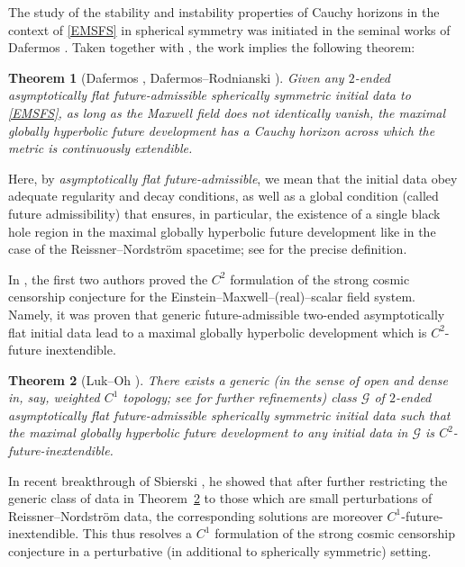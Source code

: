 \documentclass[10pt, reqno]{amsart}
\newtheorem{theorem}{Theorem}[section]
\theoremstyle{definition}
\theoremstyle{remark}
\numberwithin{equation}{section}
\newcommand{\0}{\emptyset}
\begin{document}
The study of the stability and instability properties of Cauchy horizons in the context of \eqref{EMSFS} in spherical symmetry was initiated in the seminal works of Dafermos \cite{D1,D2}. Taken together with \cite{DRPL}, the work \cite{D2} implies the following theorem:
\begin{theorem}[Dafermos \cite{D2}, Dafermos--Rodnianski \cite{DRPL}]
Given any $2$-ended asymptotically flat future-admissible spherically symmetric initial data to \eqref{EMSFS}, as long as the Maxwell field does not identically vanish, the maximal globally hyperbolic future development has a Cauchy horizon across which the metric is continuously extendible.
\end{theorem}

Here, by \emph{asymptotically flat future-admissible}, we mean that the initial data obey adequate regularity and decay conditions, as well as a global condition (called future admissibility) that ensures, in particular, the existence of a single black hole region in the maximal globally hyperbolic future development like in the case of the Reissner--Nordstr\"om spacetime; see \cite[Definition~3.1]{LO.interior} for the precise definition.

In \cite{LO.interior, LO.exterior}, the first two authors proved the $C^2$ formulation of the strong cosmic censorship conjecture for the Einstein--Maxwell--(real)--scalar field system. Namely, it was proven that generic future-admissible two-ended asymptotically flat initial data lead to a maximal globally hyperbolic development which is $C^2$-future inextendible. 

\begin{theorem}[Luk--Oh \cite{LO.interior, LO.exterior}]\label{thm:SCC}
There exists a generic (in the sense of open and dense in, say, weighted $C^1$ topology; see \cite{LO.interior} for further refinements) class $\mathcal G$ of $2$-ended asymptotically flat future-admissible spherically symmetric initial data such that the maximal globally hyperbolic future development to any initial data in $\mathcal G$ is $C^2$-future-inextendible.
\end{theorem}

In recent breakthrough of Sbierski \cite{Sbierski.C1}, he showed that after further restricting the generic class of data in Theorem~\ref{thm:SCC} to those which are small perturbations of Reissner--Nordstr\"om data, the corresponding solutions are moreover $C^1$-future-inextendible. This thus resolves a $C^1$ formulation of the strong cosmic censorship conjecture in a perturbative (in additional to spherically symmetric) setting.
\end{document}
